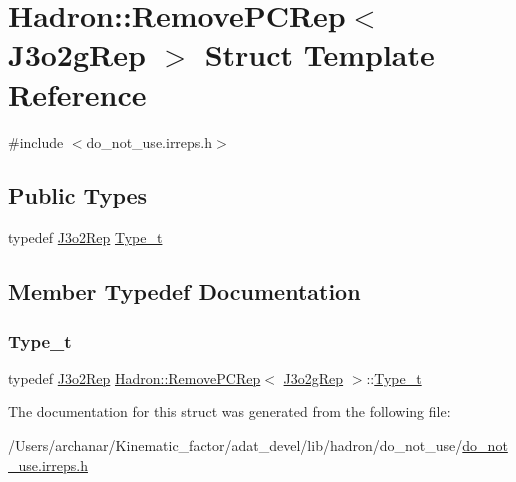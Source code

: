 \hypertarget{structHadron_1_1RemovePCRep_3_01J3o2gRep_01_4}{}\section{Hadron\+:\+:Remove\+P\+C\+Rep$<$ J3o2g\+Rep $>$ Struct Template Reference}
\label{structHadron_1_1RemovePCRep_3_01J3o2gRep_01_4}


{\ttfamily \#include $<$do\+\_\+not\+\_\+use.\+irreps.\+h$>$}

\subsection*{Public Types}
\begin{DoxyCompactItemize}
\item 
typedef \mbox{\hyperlink{structHadron_1_1J3o2Rep}{J3o2\+Rep}} \mbox{\hyperlink{structHadron_1_1RemovePCRep_3_01J3o2gRep_01_4_aa50bb0d4b58454b97bf8e9a4d3eb0a1b}{Type\+\_\+t}}
\end{DoxyCompactItemize}


\subsection{Member Typedef Documentation}
\mbox{\label{structHadron_1_1RemovePCRep_3_01J3o2gRep_01_4_aa50bb0d4b58454b97bf8e9a4d3eb0a1b}} 
\subsubsection{\texorpdfstring{Type\_t}{Type\_t}}
{\footnotesize\ttfamily typedef \mbox{\hyperlink{structHadron_1_1J3o2Rep}{J3o2\+Rep}} \mbox{\hyperlink{structHadron_1_1RemovePCRep}{Hadron\+::\+Remove\+P\+C\+Rep}}$<$ \mbox{\hyperlink{structHadron_1_1J3o2gRep}{J3o2g\+Rep}} $>$\+::\mbox{\hyperlink{structHadron_1_1RemovePCRep_3_01J3o2gRep_01_4_aa50bb0d4b58454b97bf8e9a4d3eb0a1b}{Type\+\_\+t}}}



The documentation for this struct was generated from the following file\+:\begin{DoxyCompactItemize}
\item 
/\+Users/archanar/\+Kinematic\+\_\+factor/adat\+\_\+devel/lib/hadron/do\+\_\+not\+\_\+use/\mbox{\hyperlink{do__not__use_8irreps_8h}{do\+\_\+not\+\_\+use.\+irreps.\+h}}\end{DoxyCompactItemize}
